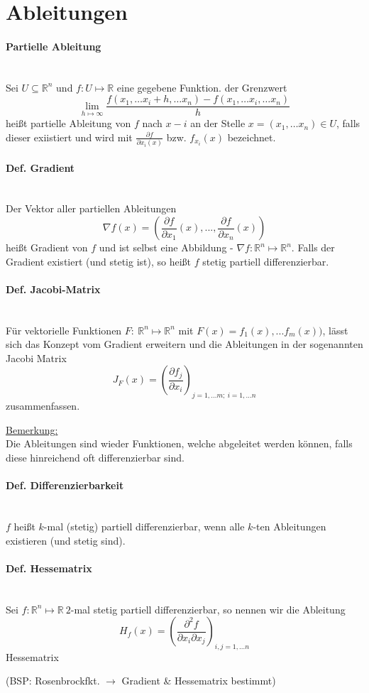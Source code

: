 \section{Ableitungen}
\label{chap:Ableitungen}

\paragraph{Partielle Ableitung}\ \\
Sei $U \subseteq \mathbb{R}^n$ und $f: U \mapsto \mathbb{R}$ eine gegebene Funktion. der Grenzwert
$$\lim_{h \mapsto \infty}\frac{f(x_1, \dots x_i+h,\dots x_n)-f(x_1,\dots x_i,\dots x_n)}{h}$$
heißt partielle Ableitung von $f$ nach $x-i$ an der Stelle $x=(x_1,\dots x_n)\in U$, falls dieser exiistiert und wird mit $\frac{\partial f}{\partial x_i(x)}$ bzw. $f_{x_i}(x)$ bezeichnet.\\


\paragraph{Def. Gradient}\ \\
Der Vektor aller partiellen Ableitungen 
$$\nabla f(x) = \left(\frac{\partial f}{\partial x_1}(x), ... , \frac{\partial f}{\partial x_n} (x) \right)$$ heißt Gradient von $f$ und ist selbst eine Abbildung - $\nabla f : \mathbb R^n \mapsto \mathbb R^n$. Falls der Gradient existiert (und stetig ist), so heißt $f$ stetig partiell differenzierbar.

\paragraph{Def. Jacobi-Matrix}\ \\
Für vektorielle Funktionen $F: \ \mathbb{R}^n \mapsto \mathbb{R}^n$ mit $F(x) = f_1(x), ... f_m(x))$, lässt sich das Konzept vom Gradient erweitern und die Ableitungen in der sogenannten Jacobi Matrix
$$J_F (x) = (\frac{\partial f_j}{\partial x_i})_{j= 1,\dots m;\ i= 1,\dots n}$$
zusammenfassen.

\noindent
\underline{Bemerkung:}\\
Die Ableitungen sind wieder Funktionen, welche abgeleitet werden können, falls diese hinreichend oft differenzierbar sind.

\paragraph{Def. Differenzierbarkeit}\ \\
$f$ heißt $k$-mal (stetig) partiell differenzierbar, wenn alle $k$-ten Ableitungen existieren (und stetig sind).

\paragraph{Def. Hessematrix}\ \\
Sei $f: \mathbb R^n \mapsto \mathbb R\ 2$-mal stetig partiell differenzierbar, so nennen wir die Ableitung
$$H_f(x) = \left(\frac{\partial^2f}{\partial x_i \partial x_j} \right)_{i,j=1,...n}$$ Hessematrix

(BSP: Rosenbrockfkt. $\rightarrow$ Gradient \& Hessematrix bestimmt)
